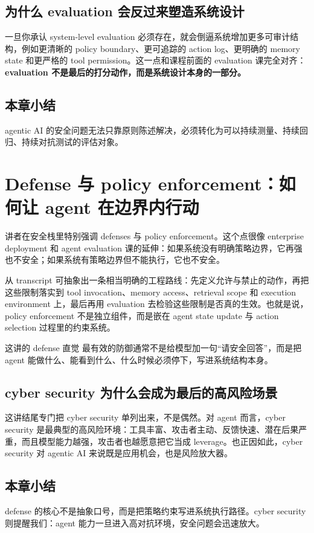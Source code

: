 \documentclass[a4paper]{article}
\begin{document}
\subsection{为什么 evaluation 会反过来塑造系统设计}
一旦你承认 system-level evaluation 必须存在，就会倒逼系统增加更多可审计结构，例如更清晰的 policy boundary、更可追踪的 action log、更明确的 memory state 和更严格的 tool permission。这一点和课程前面的 evaluation 课完全对齐：\textbf{evaluation 不是最后的打分动作，而是系统设计本身的一部分。}

\subsection{本章小结}
agentic AI 的安全问题无法只靠原则陈述解决，必须转化为可以持续测量、持续回归、持续对抗测试的评估对象。

\section{Defense 与 policy enforcement：如何让 agent 在边界内行动}
讲者在安全栈里特别强调 defenses 与 policy enforcement。这个点很像 enterprise deployment 和 agent evaluation 课的延伸：如果系统没有明确策略边界，它再强也不安全；如果系统有策略边界但不能执行，它也不安全。

从 transcript 可抽象出一条相当明确的工程路线：先定义允许与禁止的动作，再把这些限制落实到 tool invocation、memory access、retrieval scope 和 execution environment 上，最后再用 evaluation 去检验这些限制是否真的生效。也就是说，policy enforcement 不是独立组件，而是嵌在 agent state update 与 action selection 过程里的约束系统。

\begin{knowledgebox}{这讲的 defense 直觉}
最有效的防御通常不是给模型加一句“请安全回答”，而是把 agent 能做什么、能看到什么、什么时候必须停下，写进系统结构本身。
\end{knowledgebox}

\subsection{cyber security 为什么会成为最后的高风险场景}
这讲结尾专门把 cyber security 单列出来，不是偶然。对 agent 而言，cyber security 是最典型的高风险环境：工具丰富、攻击者主动、反馈快速、潜在后果严重，而且模型能力越强，攻击者也越愿意把它当成 leverage。也正因如此，cyber security 对 agentic AI 来说既是应用机会，也是风险放大器。

\subsection{本章小结}
defense 的核心不是抽象口号，而是把策略约束写进系统执行路径。cyber security 则提醒我们：agent 能力一旦进入高对抗环境，安全问题会迅速放大。
\end{document}
